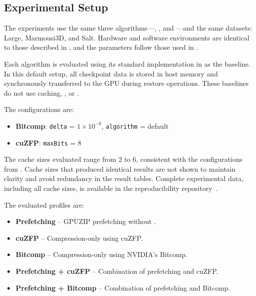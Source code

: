 \documentclass[Ingles,Final]{ic-tese-v3}
\begin{document}
\subsection{Experimental Setup}
\label{sec:comppref_experimental_setup}

The experiments use the same three \checkpointing algorithms—\revolve, \zcut, and \uniform—and the same datasets: Large, Marmousi3D, and Salt. Hardware and software environments are identical to those described in , and the \compression parameters follow those used in .

Each \checkpointing algorithm is evaluated using its standard implementation in \awave as the baseline. In this default setup, all checkpoint data is stored in host memory and synchronously transferred to the GPU during restore operations. These baselines do not use caching, \compression, or \prefetching.

The \compression configurations are:

\begin{itemize}
    \item \textbf{Bitcomp}: \texttt{delta} = $1 \times 10^{-8}$, \texttt{algorithm} = default
    \item \textbf{cuZFP}: \texttt{maxBits} = 8
\end{itemize}

The cache sizes evaluated range from 2 to 6, consistent with the configurations from . Cache sizes that produced identical results are not shown to maintain clarity and avoid redundancy in the result tables. Complete experimental data, including all cache sizes, is available in the reproducibility repository~\cite{ds}.

The evaluated profiles are:

\begin{itemize}
    \item \textbf{Prefetching} – GPUZIP prefetching without \compression.
    \item \textbf{cuZFP} – Compression-only using cuZFP.
    \item \textbf{Bitcomp} – Compression-only using NVIDIA’s Bitcomp.
    \item \textbf{Prefetching + cuZFP} – Combination of prefetching and cuZFP.
    \item \textbf{Prefetching + Bitcomp} – Combination of prefetching and Bitcomp.
\end{itemize}
\end{document}
